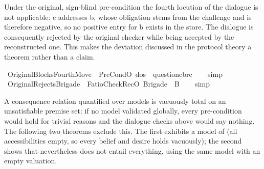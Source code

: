 \begin{isabellebody}
%
\endisatagdocument
{\isafolddocument}%
%
\isadelimdocument
%
\endisadelimdocument
%
\begin{isamarkuptext}%
Under the original, sign-blind pre-condition the fourth locution of the
dialogue is not applicable: c addresses b, whose obligation stems from the
challenge and is therefore negative, so no positive entry for b exists in the
store. The dialogue is consequently rejected by the original checker while being
accepted by the reconstructed one. This makes the deviation discussed in the
protocol theory a theorem rather than a claim.%
\end{isamarkuptext}\isamarkuptrue%
\isamarkupfalse%
\ OriginalBlocksFourthMove{\isacharcolon}{\kern0pt}\ {\isachardoublequoteopen}{\isasymnot}\ PreCondO\ dos\ {\isasymGamma}\ question{\isacharbrackleft}{\kern0pt}c{\isacharcomma}{\kern0pt}b{\isacharcomma}{\kern0pt}r\isactrlsup c{\isacharbrackright}{\kern0pt}{\isachardoublequoteclose}\isanewline
%
\isadelimproof
\ \ %
\endisadelimproof
%
\isatagproof
{}\isamarkupfalse%
\ simp%
\endisatagproof
{\isafoldproof}%
%
\isadelimproof
\isanewline
%
\endisadelimproof
\isanewline
{}\isamarkupfalse%
\ OriginalRejectsBrigade{\isacharcolon}{\kern0pt}\ {\isachardoublequoteopen}{\isasymnot}\ FatioCheckRecO\ Brigade\ {\isacharbrackleft}{\kern0pt}{\isacharbrackright}{\kern0pt}\ {\isasymGamma}\isactrlsub B{\isachardoublequoteclose}\isanewline
%
\isadelimproof
\ \ %
\endisadelimproof
%
\isatagproof
{}\isamarkupfalse%
\ simp%
\endisatagproof
{\isafoldproof}%
%
\isadelimproof
%
\endisadelimproof
%
\isadelimdocument
%
\endisadelimdocument
%
\isatagdocument
%
\isamarkuptrue%
%
\endisatagdocument
{\isafolddocument}%
%
\isadelimdocument
%
\endisadelimdocument
%
\begin{isamarkuptext}%
A consequence relation quantified over models is vacuously total on an
unsatisfiable premise set: if no model validated  globally, every pre-condition
would hold for trivial reasons and the dialogue checks above would say nothing.
The following two theorems exclude this. The first exhibits a model of  (all
accessibilities empty, so every belief and desire holds vacuously); the second
shows that  nevertheless does not entail everything, using the same model with
an empty valuation.%
\end{isamarkuptext}\isamarkuptrue%

\end{isabellebody}
